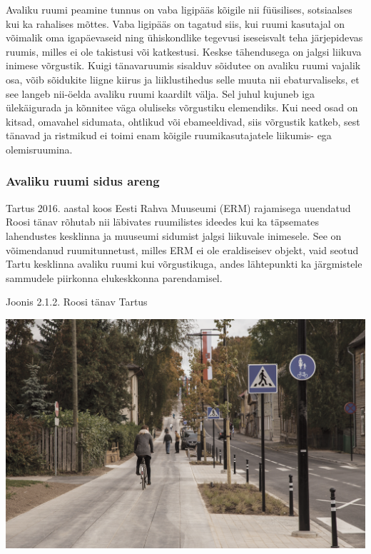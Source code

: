 \documentclass[estonian,]{article}
\begin{document}
Avaliku ruumi peamine tunnus on vaba ligipääs kõigile nii füüsilises, sotsiaalses kui ka rahalises mõttes. Vaba ligipääs on tagatud siis, kui ruumi kasutajal on võimalik oma igapäevaseid ning ühiskondlike tegevusi iseseisvalt teha järjepidevas ruumis, milles ei ole takistusi või katkestusi. Keskse tähendusega on jalgsi liikuva inimese võrgustik. Kuigi tänavaruumis sisalduv sõidutee on avaliku ruumi vajalik osa, võib sõidukite liigne kiirus ja liiklustihedus selle muuta nii ebaturvaliseks, et see langeb nii-öelda avaliku ruumi kaardilt välja. Sel juhul kujuneb iga ülekäigurada ja kõnnitee väga oluliseks võrgustiku elemendiks. Kui need osad on kitsad, omavahel sidumata, ohtlikud või ebameeldivad, siis võrgustik katkeb, sest tänavad ja ristmikud ei toimi enam kõigile ruumikasutajatele liikumis- ega olemisruumina.

\hypertarget{avaliku-ruumi-sidus-areng}{%
\subsubsection{Avaliku ruumi sidus areng}\label{avaliku-ruumi-sidus-areng}}

Tartus 2016. aastal koos Eesti Rahva Muuseumi (ERM) rajamisega uuendatud Roosi tänav rõhutab nii läbivates ruumilistes ideedes kui ka täpsemates lahendustes kesklinna ja muuseumi sidumist jalgsi liikuvale inimesele. See on võimendanud ruumitunnetust, milles ERM ei ole eraldiseisev objekt, vaid seotud Tartu kesklinna avaliku ruumi kui võrgustikuga, andes lähtepunkti ka järgmistele sammudele piirkonna elukeskkonna parendamisel.

{Joonis 2.1.2.} Roosi tänav Tartus

\begin{center}\includegraphics[width=0.9\linewidth]{figures/2-chapter/fig212} \end{center}
\end{document}
